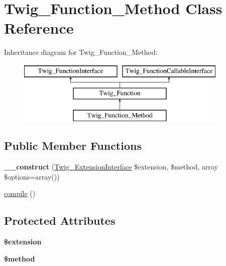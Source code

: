 \hypertarget{classTwig__Function__Method}{}\section{Twig\+\_\+\+Function\+\_\+\+Method Class Reference}
\label{classTwig__Function__Method}
Inheritance diagram for Twig\+\_\+\+Function\+\_\+\+Method\+:\begin{figure}[H]
\begin{center}
\leavevmode
\includegraphics[height=3.000000cm]{classTwig__Function__Method}
\end{center}
\end{figure}
\subsection*{Public Member Functions}
\begin{DoxyCompactItemize}
\item 
{\bfseries \+\_\+\+\_\+construct} (\hyperlink{interfaceTwig__ExtensionInterface}{Twig\+\_\+\+Extension\+Interface} \$extension, \$method, array \$options=array())\hypertarget{classTwig__Function__Method_a008a0afde0b5ab8bd66bd18e37da1184}{}\label{classTwig__Function__Method_a008a0afde0b5ab8bd66bd18e37da1184}

\item 
\hyperlink{classTwig__Function__Method_a64c4ce1106c5ea2f95a7847d6ede81de}{compile} ()
\end{DoxyCompactItemize}
\subsection*{Protected Attributes}
\begin{DoxyCompactItemize}
\item 
{\bfseries \$extension}\hypertarget{classTwig__Function__Method_a9a53b7c276453ff6d2a3573a278a6c8f}{}\label{classTwig__Function__Method_a9a53b7c276453ff6d2a3573a278a6c8f}

\item 
{\bfseries \$method}\hypertarget{classTwig__Function__Method_a304008c7d2104025d932db9e5873cdba}{}\label{classTwig__Function__Method_a304008c7d2104025d932db9e5873cdba}

\end{DoxyCompactItemize}


